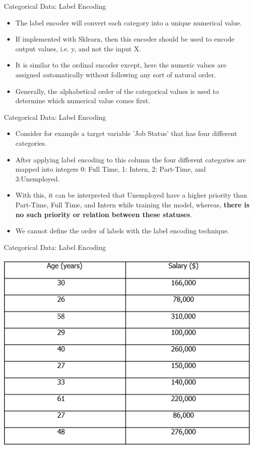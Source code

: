 \documentclass[11pt]{beamer}
\begin{document}
\begin{frame}{Categorical Data: Label Encoding}
	\begin{itemize}
		\item The label encoder will convert each category into a unique numerical value. 
		\item If implemented with Sklearn, then this encoder should be used to encode output values, i.e. y, and not the input X. 
		\item It is similar to the ordinal encoder except, here the numeric values are assigned automatically without following any sort of natural order. 
		\item Generally, the alphabetical order of the categorical values is used to determine which numerical value comes first. 
	\end{itemize}
\end{frame}
%
%
\begin{frame}{Categorical Data: Label Encoding}
	\begin{itemize}
		\item Consider for example a target variable 'Job Status' that has four different categories. 
		\item After applying label encoding to this column the four different categories are mapped into integers 0: Full Time, 1: Intern, 2: Part-Time, and 3:Unemployed. 
		\item With this, it can be interpreted that Unemployed have a higher priority than Part-Time, Full Time, and Intern while training the model, whereas, \textbf{there is no such priority or relation between these statuses}. 
		\item We cannot define the order of labels with the label encoding technique.
	\end{itemize}
\end{frame}
%
%
\begin{frame}{Categorical Data: Label Encoding}
	\begin{center}
	\includegraphics[scale=1]{../05-pictures/lesson-2-1_pic_3.png}
	\end{center}
\end{frame}
\end{document}
